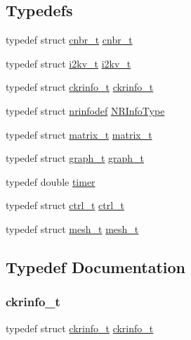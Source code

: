 \subsection*{Typedefs}
\begin{DoxyCompactItemize}
\item 
typedef struct \hyperlink{a00714}{cnbr\+\_\+t} \hyperlink{a00978_a54085030666776388a608ae9b3ce54a5}{cnbr\+\_\+t}
\item 
typedef struct \hyperlink{a00746}{i2kv\+\_\+t} \hyperlink{a00978_a0d6454ca12151d9b5ffa6c767b2b4b52}{i2kv\+\_\+t}
\item 
typedef struct \hyperlink{a00718}{ckrinfo\+\_\+t} \hyperlink{a00978_a9cb380dd81e9a25cb4ac8683d7d8b501}{ckrinfo\+\_\+t}
\item 
typedef struct \hyperlink{a00750}{nrinfodef} \hyperlink{a00978_a6393d515f02fcdaf17a06297a8db5bbb}{N\+R\+Info\+Type}
\item 
typedef struct \hyperlink{a00754}{matrix\+\_\+t} \hyperlink{a00978_add627d5d6cabf1f3b5ad16c9d24ebb49}{matrix\+\_\+t}
\item 
typedef struct \hyperlink{a00734}{graph\+\_\+t} \hyperlink{a00978_a595dd93a0717173364e453106ddb452b}{graph\+\_\+t}
\item 
typedef double \hyperlink{a00978_aae821c36bb7e6918e1414484f939c3d4}{timer}
\item 
typedef struct \hyperlink{a00742}{ctrl\+\_\+t} \hyperlink{a00978_aac7626715ed16c0c60748cde0ed57c0a}{ctrl\+\_\+t}
\item 
typedef struct \hyperlink{a00738}{mesh\+\_\+t} \hyperlink{a00978_a911cce53c8371e7161a53b96fdfd6a72}{mesh\+\_\+t}
\end{DoxyCompactItemize}


\subsection{Typedef Documentation}
\mbox{\label{a00978_a9cb380dd81e9a25cb4ac8683d7d8b501}} 
\subsubsection{\texorpdfstring{ckrinfo\+\_\+t}{ckrinfo\_t}}
{\footnotesize\ttfamily typedef struct \hyperlink{a00718}{ckrinfo\+\_\+t}  \hyperlink{a00718}{ckrinfo\+\_\+t}}

